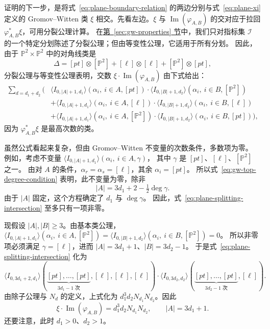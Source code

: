 证明的下一步，是将式~\eqref{eq:plane-boundary-relation} 的两边分别与式~\eqref{eq:plane-xi}
定义的 Gromov--Witten 类 $\xi$ 相交。先看左边。$\xi$ 与 $\operatorname{Im}(\varphi_{A,B})$
的交对应于拉回 $\varphi_{A,B}^*\xi$，可用分裂公理计算。
在\hyperref[sec:gw-properties]{第~\ref*{sec:gw-properties} 节}中，我们只对指标集 $\mathcal I$
的一个特定分划陈述了分裂公理；但由等变性公理，它适用于所有分划。
因此，由于 $\mathbb P^2\times\mathbb P^2$ 中的对角线类是
\[
\Delta=[pt]\otimes[\mathbb P^2]+[\ell]\otimes[\ell]+[\mathbb P^2]\otimes[pt],
\]
分裂公理与等变性公理表明，交数 $\xi\cdot\operatorname{Im}(\varphi_{A,B})$ 由下式给出：
\begin{equation}\label{eq:plane-splitting-intersection}
\begin{aligned}
\sum_{d=d_1+d_2}\Big(&\langle I_{0,|A|+1,d_1}\rangle(\alpha_i,\ i\in A,[pt])
\cdot\langle I_{0,|B|+1,d_2}\rangle(\alpha_i,\ i\in B,[\mathbb P^2])\\
&+\langle I_{0,|A|+1,d_1}\rangle(\alpha_i,\ i\in A,[\ell])
\cdot\langle I_{0,|B|+1,d_2}\rangle(\alpha_i,\ i\in B,[\ell])\\
&+\langle I_{0,|A|+1,d_1}\rangle(\alpha_i,\ i\in A,[\mathbb P^2])
\cdot\langle I_{0,|B|+1,d_2}\rangle(\alpha_i,\ i\in B,[pt])\Big),
\end{aligned}
\end{equation}
因为 $\varphi_{A,B}^*\xi$ 是最高次数的类。

虽然公式看起来复杂，但由 Gromov--Witten 不变量的次数条件，多数项为零。
例如，考虑不变量 $\langle I_{0,|A|+1,d_1}\rangle(\alpha_i,\ i\in A,\gamma)$，
其中 $\gamma$ 是 $[pt]$、$[\ell]$、$[\mathbb P^2]$ 之一。
由对 $A$ 的条件，$\alpha_r=\alpha_s=[\ell]$，其余 $\alpha_i=[pt]$。
所以式~\eqref{eq:gw-top-degree-condition} 表明，此不变量为零，除非
\[
|A|=3d_1+2-\tfrac12\deg\gamma.
\]
由于 $|A|$ 固定，这个方程确定了 $d_1$ 与 $\deg\gamma$。
因此，式~\eqref{eq:plane-splitting-intersection} 至多只有一项非零。

现假设 $|A|,|B|\geq3$。由基本类公理，
$\langle I_{0,|A|+1,d_1}\rangle(\alpha_i,\ i\in A,[\mathbb P^2])
=\langle I_{0,|B|+1,d_2}\rangle(\alpha_i,\ i\in B,[\mathbb P^2])=0$。
所以非零项必须满足 $\gamma=[\ell]$，进而 $|A|=3d_1+1$、$|B|=3d_2-1$。
于是式~\eqref{eq:plane-splitting-intersection} 化为
\[
\langle I_{0,3d_1+2,d_1}\rangle(\underbrace{[pt],\ldots,[pt]}_{3d_1-1\text{ 次}},[\ell],[\ell],[\ell])
\cdot\langle I_{0,3d_2,d_2}\rangle(\underbrace{[pt],\ldots,[pt]}_{3d_2-1\text{ 次}},[\ell]).
\]
由除子公理与 $N_d$ 的定义，上式化为 $d_1^3d_2N_{d_1}N_{d_2}$。因此
\begin{equation}\label{eq:plane-boundary-positive}
\xi\cdot\operatorname{Im}(\varphi_{A,B})=d_1^3d_2N_{d_1}N_{d_2},\qquad |A|=3d_1+1.
\end{equation}
还要注意，此时 $d_1>0$、$d_2>1$。

